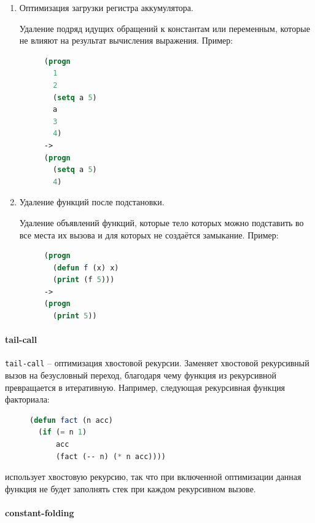 \begin{enumerate}

\item Оптимизация загрузки регистра аккумулятора.

Удаление подряд идущих обращений к константам или переменным, которые не влияют на результат вычисления выражения. Пример:
\begin{figure}[H]
\begin{lstlisting}[language=Lisp]
(progn
  1
  2
  (setq a 5)
  a
  3
  4)
->
(progn
  (setq a 5)
  4)
\end{lstlisting}
\end{figure}


\item Удаление функций после подстановки.

Удаление объявлений функций, которые тело которых можно подставить во все места их вызова и для которых не создаётся замыкание. Пример:
\begin{figure}[H]
\begin{lstlisting}[language=Lisp]
(progn
  (defun f (x) x)
  (print (f 5)))
->
(progn
  (print 5))
\end{lstlisting}
\end{figure}

\end{enumerate}


\paragraph{tail-call}

\texttt{tail-call} -- оптимизация хвостовой рекурсии. Заменяет хвостовой рекурсивный вызов на безусловный переход, благодаря чему функция из рекурсивной превращается в итеративную. Например, следующая рекурсивная функция факториала:

\begin{figure}[H]
\begin{lstlisting}[language=Lisp]
(defun fact (n acc)
  (if (= n 1)
      acc
      (fact (-- n) (* n acc))))
\end{lstlisting}
\end{figure}

использует хвостовую рекурсию, так что при включенной оптимизации данная функция не будет заполнять стек при каждом рекурсивном вызове.


\paragraph{constant-folding}

